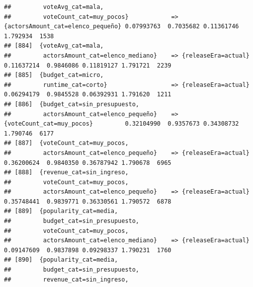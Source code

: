 \documentclass[
]{article}
\begin{document}
\begin{verbatim}
##         voteAvg_cat=mala,                                                                                                       
##         voteCount_cat=muy_pocos}            => {actorsAmount_cat=elenco_pequeño} 0.07993763  0.7035682 0.11361746 1.792934  1538
## [884]  {voteAvg_cat=mala,                                                                                                       
##         actorsAmount_cat=elenco_mediano}    => {releaseEra=actual}               0.11637214  0.9846086 0.11819127 1.791721  2239
## [885]  {budget_cat=micro,                                                                                                       
##         runtime_cat=corto}                  => {releaseEra=actual}               0.06294179  0.9845528 0.06392931 1.791620  1211
## [886]  {budget_cat=sin_presupuesto,                                                                                             
##         actorsAmount_cat=elenco_pequeño}    => {voteCount_cat=muy_pocos}         0.32104990  0.9357673 0.34308732 1.790746  6177
## [887]  {voteCount_cat=muy_pocos,                                                                                                
##         actorsAmount_cat=elenco_pequeño}    => {releaseEra=actual}               0.36200624  0.9840350 0.36787942 1.790678  6965
## [888]  {revenue_cat=sin_ingreso,                                                                                                
##         voteCount_cat=muy_pocos,                                                                                                
##         actorsAmount_cat=elenco_pequeño}    => {releaseEra=actual}               0.35748441  0.9839771 0.36330561 1.790572  6878
## [889]  {popularity_cat=media,                                                                                                   
##         budget_cat=sin_presupuesto,                                                                                             
##         voteCount_cat=muy_pocos,                                                                                                
##         actorsAmount_cat=elenco_mediano}    => {releaseEra=actual}               0.09147609  0.9837898 0.09298337 1.790231  1760
## [890]  {popularity_cat=media,                                                                                                   
##         budget_cat=sin_presupuesto,                                                                                             
##         revenue_cat=sin_ingreso,                                                                                                

\end{verbatim}
\end{document}
